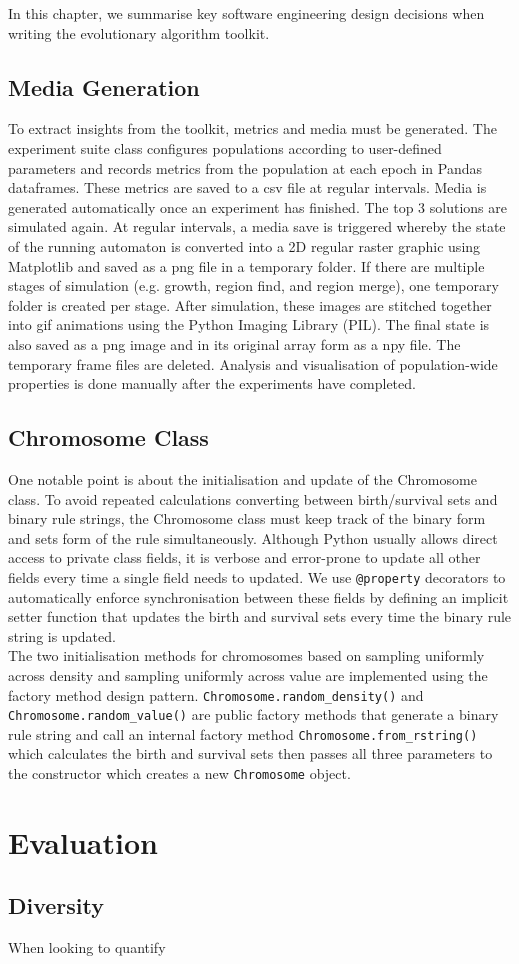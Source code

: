In this chapter, we summarise key software engineering design decisions when writing the evolutionary algorithm toolkit.

\subsection{Media Generation}
To extract insights from the toolkit, metrics and media must be generated. The experiment suite class configures populations according to user-defined parameters and records metrics from the population at each epoch in Pandas dataframes. These metrics are saved to a csv file at regular intervals. Media is generated automatically once an experiment has finished. The top 3 solutions are simulated again. At regular intervals, a media save is triggered whereby the state of the running automaton is converted into a 2D regular raster graphic using Matplotlib and saved as a png file in a temporary folder. If there are multiple stages of simulation (e.g. growth, region find, and region merge), one temporary folder is created per stage. After simulation, these images are stitched together into gif animations using the Python Imaging Library (PIL). The final state is also saved as a png image and in its original array form as a npy file. The temporary frame files are deleted. Analysis and visualisation of population-wide properties is done manually after the experiments have completed.\\

\subsection{Chromosome Class}
One notable point is about the initialisation and update of the Chromosome class. To avoid repeated calculations converting between birth/survival sets and binary rule strings, the Chromosome class must keep track of the binary form and sets form of the rule simultaneously. Although Python usually allows direct access to private class fields, it is verbose and error-prone to update all other fields every time a single field needs to updated. We use \texttt{@property} decorators to automatically enforce synchronisation between these fields by defining an implicit setter function that updates the birth and survival sets every time the binary rule string is updated.\\

The two initialisation methods for chromosomes based on sampling uniformly across density and sampling uniformly across value are implemented using the factory method design pattern. \texttt{Chromosome.random\_density()} and \texttt{Chromosome.random\_value()} are public factory methods that generate a binary rule string and call an internal factory method \texttt{Chromosome.from\_rstring()} which calculates the birth and survival sets then passes all three parameters to the constructor which creates a new \texttt{Chromosome} object.

\section{Evaluation} \label{sec:lifelike-evaluation}

\subsection{Diversity}
When looking to quantify